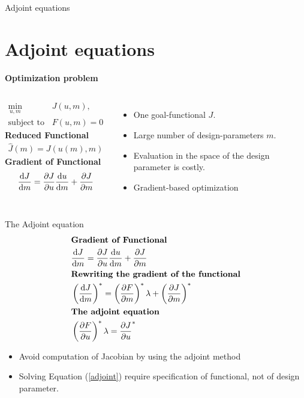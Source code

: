 \documentclass[mathserif]{beamer}
\begin{document}
\begin{frame}{Adjoint equations\section{Adjoint equations}}
  \textbf{Optimization problem}
  \begin{columns}
    \begin{align*}
      \min_{u,m}\quad&J(u,m),\\
      \text{subject to  } & F(u,m)=0
    \end{align*}
    \textbf{Reduced Functional}
    \begin{align*}
      \hat J(m)=J(u(m),m)
    \end{align*}
    \textbf{Gradient of Functional}
    \begin{align*}
      \frac{\mathrm{d}J}{\mathrm{d} m}=\frac{\partial J}{\partial u}\frac{\mathrm{d}u}{\mathrm{d} m}+\frac{\partial J}{\partial m}
    \end{align*}
    
    \begin{itemize}
    \item One goal-functional $J$.\vspace{0.5cm}
    \item Large number of design-parameters $m$.\vspace{0.5cm}
    \item Evaluation in the space of the design parameter is costly.\vspace{0.5cm}
    \item Gradient-based optimization
    \end{itemize}
  \end{columns}
\end{frame}

\begin{frame}{The Adjoint equation}
  \begin{align}
    &\textbf{Gradient of Functional}\nonumber\\  
    &\frac{\mathrm{d}J}{\mathrm{d} m}=\frac{\partial J}{\partial u}\frac{\mathrm{d}u}{\mathrm{d} m}+\frac{\partial J}{\partial m}\nonumber\\
    &\textbf{Rewriting the gradient of the functional}\nonumber\\
    &\left(\frac{\mathrm{d}J}{\mathrm{d} m}\right)^*=\left(\frac{\partial F}{\partial m}\right)^*
    \lambda+\left(\frac{\partial J}{\partial m}\right)^*\nonumber\\
    &\textbf{The adjoint equation}\nonumber\\
    &\left(\frac{\partial F}{\partial u} \right)^*\lambda = \frac{\partial J}{\partial u}^*\label{adjoint}
  \end{align}
  
  \begin{itemize}
  \item Avoid computation of Jacobian by using the adjoint method
  \item Solving Equation (\ref{adjoint}) require 
    specification of functional, not of design parameter.
  \end{itemize}

\end{frame}
\end{document}
